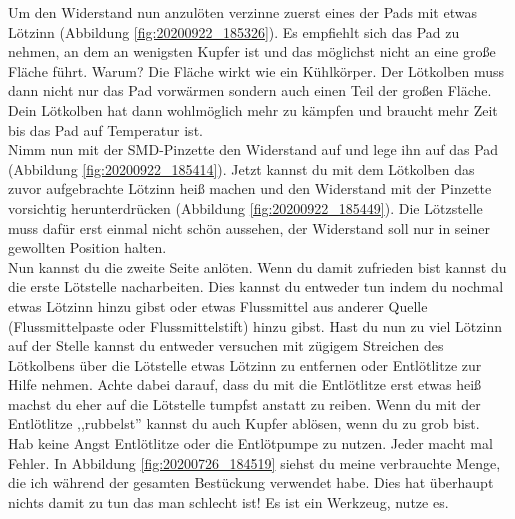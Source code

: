\documentclass[12pt, a4paper]{article}		%
\begin{document}
Um den Widerstand nun anzulöten verzinne zuerst eines der Pads mit etwas Lötzinn (Abbildung \ref{fig:20200922_185326}). Es empfiehlt sich das Pad zu nehmen, an dem an wenigsten Kupfer ist und das möglichst nicht an eine große Fläche führt. Warum? Die Fläche wirkt wie ein Kühlkörper. Der Lötkolben muss dann nicht nur das Pad vorwärmen sondern auch einen Teil der großen Fläche. Dein Lötkolben hat dann wohlmöglich mehr zu kämpfen und braucht mehr Zeit bis das Pad auf Temperatur ist.\\ \newline
Nimm nun mit der SMD-Pinzette den Widerstand auf und lege ihn auf das Pad (Abbildung \ref{fig:20200922_185414}). Jetzt kannst du mit dem Lötkolben das zuvor aufgebrachte Lötzinn heiß machen und den Widerstand mit der Pinzette vorsichtig herunterdrücken (Abbildung \ref{fig:20200922_185449}). Die Lötzstelle muss dafür erst einmal nicht schön aussehen, der Widerstand soll nur in seiner gewollten Position halten.\\ \newline
Nun kannst du die zweite Seite anlöten. Wenn du damit zufrieden bist kannst du die erste Lötstelle nacharbeiten. Dies kannst du entweder tun indem du nochmal etwas Lötzinn hinzu gibst oder etwas Flussmittel aus anderer Quelle (Flussmittelpaste oder Flussmittelstift) hinzu gibst. Hast du nun zu viel Lötzinn auf der Stelle kannst du entweder versuchen mit zügigem Streichen des Lötkolbens über die Lötstelle etwas Lötzinn zu entfernen oder Entlötlitze zur Hilfe nehmen. Achte dabei darauf, dass du mit die Entlötlitze erst etwas heiß machst du eher auf die Lötstelle tumpfst anstatt zu reiben. Wenn du mit der Entlötlitze ,,rubbelst'' kannst du auch Kupfer ablösen, wenn du zu grob bist.\\ \newline
Hab keine Angst Entlötlitze oder die Entlötpumpe zu nutzen. Jeder macht mal Fehler. In Abbildung \ref{fig:20200726_184519} siehst du meine verbrauchte Menge, die ich während der gesamten Bestückung verwendet habe. Dies hat überhaupt nichts damit zu tun das man schlecht ist! Es ist ein Werkzeug, nutze es.
\end{document}

